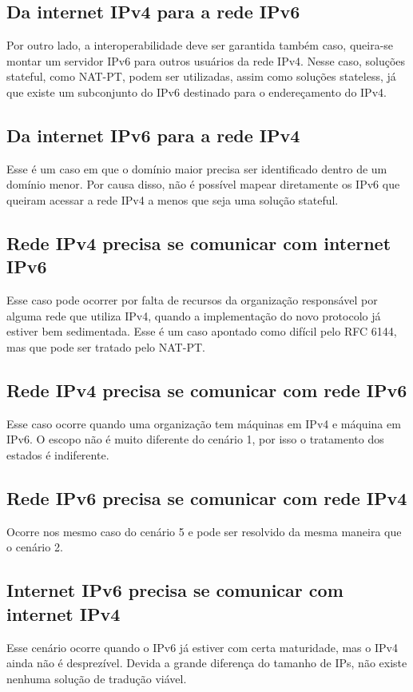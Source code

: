 \documentclass[
	12pt,				%
	oneside,			%
	a4paper,			%
	english,			%
	brazil,				%
	]{ime-abntex2}
\begin{document}
\subsection{Da internet IPv4 para a rede IPv6}
Por outro lado, a interoperabilidade deve ser garantida também caso, queira-se montar um servidor IPv6 para outros usuários da rede IPv4. Nesse caso, soluções stateful, como NAT-PT, podem ser utilizadas, assim como soluções stateless, já que existe um subconjunto do IPv6 destinado para o endereçamento do IPv4.

\subsection{Da internet IPv6 para a rede IPv4}
Esse é um caso em que o domínio maior precisa ser identificado dentro de um domínio menor. Por causa disso, não é possível mapear diretamente os IPv6 que queiram acessar a rede IPv4 a menos que seja uma solução stateful.


\subsection{Rede IPv4 precisa se comunicar com internet IPv6}
Esse caso pode ocorrer por falta de recursos da organização responsável por alguma rede que utiliza IPv4, quando a implementação do novo protocolo já estiver bem sedimentada. Esse é um caso apontado como difícil pelo RFC 6144, mas que pode ser tratado pelo NAT-PT.

\subsection{Rede IPv4 precisa se comunicar com rede IPv6}
Esse caso ocorre quando uma organização tem máquinas em IPv4 e máquina em IPv6. O escopo não é muito diferente do cenário 1, por isso o tratamento dos estados é indiferente.

\subsection{Rede IPv6 precisa se comunicar com rede IPv4}
Ocorre nos mesmo caso do cenário 5 e pode ser resolvido da mesma maneira que o cenário 2.

\subsection{Internet IPv6 precisa se comunicar com internet IPv4}
Esse cenário ocorre quando o IPv6 já estiver com certa maturidade, mas o IPv4 ainda não é desprezível. Devida a grande diferença do tamanho de IPs, não existe nenhuma solução de tradução viável.
\end{document}
